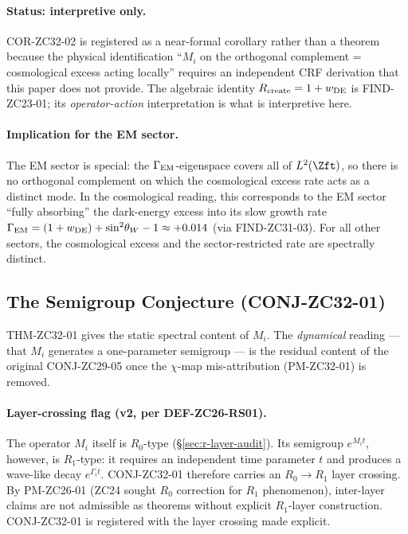 \documentclass[12pt, a4paper]{article}
\begin{document}
\paragraph{Status: interpretive only.}
COR-ZC32-02 is registered as a near-formal corollary rather
than a theorem because the physical identification
``$M_i$ on the orthogonal complement = cosmological excess
acting locally'' requires an independent CRF derivation that
this paper does not provide. The algebraic identity
$R_{\rm create} = 1 + w_{\rm DE}$ is FIND-ZC23-01; its
\emph{operator-action} interpretation is what is interpretive
here.

\paragraph{Implication for the EM sector.}
The EM sector is special: the $\Gamma_{\rm EM}$-eigenspace
covers all of $L^2(\Zft)$, so there is no orthogonal
complement on which the cosmological excess rate acts as a
distinct mode. In the cosmological reading, this corresponds
to the EM sector ``fully absorbing'' the dark-energy excess
into its slow growth rate $\Gamma_{\rm EM} =
(1+w_{\rm DE}) + \sin^2\!\theta_W - 1 \approx +0.014$
(via FIND-ZC31-03). For all other sectors, the
cosmological excess and the sector-restricted rate are
spectrally distinct.

\subsection{The Semigroup Conjecture (CONJ-ZC32-01)}
\label{sec:conj-zc32-01}

THM-ZC32-01 gives the static spectral content of $M_i$. The
\emph{dynamical} reading --- that $M_i$ generates a
one-parameter semigroup --- is the residual content of the
original CONJ-ZC29-05 once the $\chi$-map mis-attribution
(PM-ZC32-01) is removed.

\paragraph{Layer-crossing flag (v2, per DEF-ZC26-RS01).}
The operator $M_i$ itself is $R_0$-type (§\ref{sec:r-layer-audit}).
Its semigroup $e^{M_i t}$, however, is $R_1$-type: it requires
an independent time parameter $t$ and produces a wave-like
decay $e^{\Gamma_i t}$. CONJ-ZC32-01 therefore carries an
$R_0 \to R_1$ layer crossing. By PM-ZC26-01 (ZC24 sought $R_0$
correction for $R_1$ phenomenon), inter-layer claims are
not admissible as theorems without explicit $R_1$-layer
construction. CONJ-ZC32-01 is registered with the layer
crossing made explicit.
\end{document}
